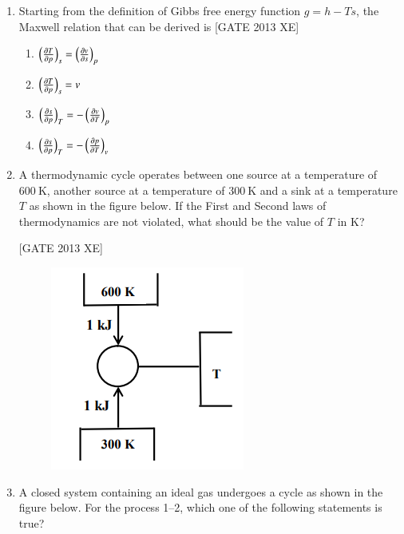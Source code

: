 \documentclass[journal,12pt,onecolumn]{IEEEtran}
\theoremstyle{remark}
\begin{document}
\begin{enumerate}
\item Starting from the definition of Gibbs free energy function $g = h - Ts$, the Maxwell relation that can be derived is \hfill[GATE 2013 XE]
\begin{multicols}{4}
\begin{enumerate}
\item $\left( \frac{\partial T}{\partial p} \right)_{s} = \left( \frac{\partial v}{\partial s} \right)_{p}$
\item $\left( \frac{\partial T}{\partial p} \right)_{s} = v$
\item $\left( \frac{\partial s}{\partial p} \right)_{T} = - \left( \frac{\partial v}{\partial T} \right)_{p}$
\item $\left( \frac{\partial s}{\partial p} \right)_{T} = - \left( \frac{\partial p}{\partial T} \right)_{v}$
\end{enumerate}
\end{multicols}
\item A thermodynamic cycle operates between one source at a temperature of $600\ \mathrm{K}$, another source at a temperature of $300\ \mathrm{K}$ and a sink at a temperature $T$ as shown in the figure below. If the First and Second laws of thermodynamics are not violated, what should be the value of $T$ in K? \underline{\hspace{2cm}}

\hfill[GATE 2013 XE]

\begin{figure}[H]
    \centering
    \includegraphics[width=0.5\columnwidth]{figs/fig27.png}
    \caption{}
    \label{fig:fig 27}
\end{figure}

\item A closed system containing an ideal gas undergoes a cycle as shown in the figure below. For the process 1–2, which one of the following statements is true?


\end{enumerate}
\end{document}
